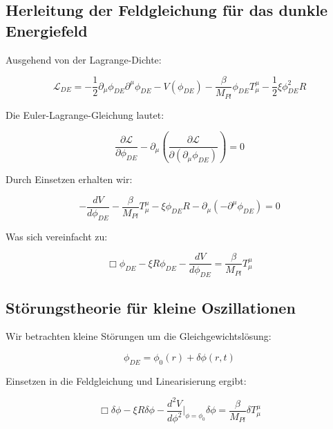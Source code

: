 \documentclass[a4paper,12pt]{article}
\begin{document}
	\subsection{Herleitung der Feldgleichung für das dunkle Energiefeld}
	
	Ausgehend von der Lagrange-Dichte:
	
	\begin{equation}
		\mathcal{L}_{DE} = -\frac{1}{2}\partial_\mu \phi_{DE} \partial^\mu \phi_{DE} - V(\phi_{DE}) - \frac{\beta}{M_{Pl}}\phi_{DE}T^{\mu}_{\mu} - \frac{1}{2}\xi \phi_{DE}^2 R
	\end{equation}
	
	Die Euler-Lagrange-Gleichung lautet:
	
	\begin{equation}
		\frac{\partial \mathcal{L}}{\partial \phi_{DE}} - \partial_\mu \left(\frac{\partial \mathcal{L}}{\partial (\partial_\mu \phi_{DE})}\right) = 0
	\end{equation}
	
	Durch Einsetzen erhalten wir:
	
	\begin{equation}
		-\frac{dV}{d\phi_{DE}} - \frac{\beta}{M_{Pl}}T^{\mu}_{\mu} - \xi \phi_{DE} R - \partial_\mu\left(-\partial^\mu \phi_{DE}\right) = 0
	\end{equation}
	
	Was sich vereinfacht zu:
	
	\begin{equation}
		\Box\phi_{DE} - \xi R \phi_{DE} - \frac{dV}{d\phi_{DE}} = \frac{\beta}{M_{Pl}}T^{\mu}_{\mu}
	\end{equation}
	
	\subsection{Störungstheorie für kleine Oszillationen}
	
	Wir betrachten kleine Störungen um die Gleichgewichtslösung:
	
	\begin{equation}
		\phi_{DE} = \phi_0(r) + \delta\phi(r,t)
	\end{equation}
	
	Einsetzen in die Feldgleichung und Linearisierung ergibt:
	
	\begin{equation}
		\Box\delta\phi - \xi R \delta\phi - \frac{d^2V}{d\phi^2}\bigg|_{\phi=\phi_0}\delta\phi = \frac{\beta}{M_{Pl}}\delta T^{\mu}_{\mu}
	\end{equation}
	
\end{document}
